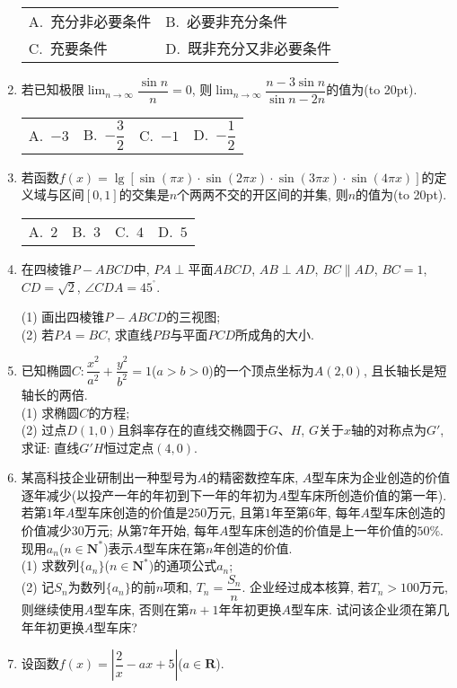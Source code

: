 \documentclass[10pt,a4paper]{article}
\newcommand{\bracket}[1]{(\hbox to #1pt{})}
\newcommand{\twoch}[4]{\par\begin{tabular}{p{.46\textwidth}p{.46\textwidth}}
A.~#1& B.~#2\\
C.~#3& D.~#4
\end{tabular}}
\newcommand{\fourch}[4]{\par\begin{tabular}{p{.23\textwidth}p{.23\textwidth}p{.23\textwidth}p{.23\textwidth}}
A.~#1 &B.~#2& C.~#3& D.~#4
\end{tabular}}
\begin{document}
\begin{enumerate}[1.]
\twoch{充分非必要条件}{必要非充分条件}{充要条件}{既非充分又非必要条件}
\item 若已知极限$\displaystyle\lim_{n\to \infty} \dfrac{\sin n}n=0$, 则$\displaystyle\lim_{n\to \infty} \dfrac{n-3\sin n}{\sin n-2n}$的值为\bracket{20}.
\fourch{$-3$}{$-\dfrac 32$}{$-1$}{$-\dfrac 12$}
\item 若函数$f(x)=\lg [\sin (\pi x)\cdot \sin (2\pi x)\cdot \sin (3\pi x)\cdot \sin (4\pi x)]$的定义域与区间$[0,1]$的交集是$n$个两两不交的开区间的并集, 则$n$的值为\bracket{20}.
\fourch{$2$}{$3$}{$4$}{$5$}
\item 在四棱锥$P-ABCD$中, $PA\perp$平面$ABCD$, $AB\perp AD$, $BC\parallel AD$, $BC=1$, $CD=\sqrt 2$, $\angle CDA=45^{^\circ}$.
\begin{center}
\end{center}
(1) 画出四棱锥$P-ABCD$的三视图;\\
(2) 若$PA=BC$, 求直线$PB$与平面$PCD$所成角的大小.
\item 已知椭圆$C:\dfrac{x^2}{a^2}+\dfrac{y^2}{b^2}=1$($a>b>0$)的一个顶点坐标为$A(2,0)$, 且长轴长是短轴长的两倍.\\
(1) 求椭圆$C$的方程;\\
(2) 过点$D(1,0)$且斜率存在的直线交椭圆于$G$、$H$, $G$关于$x$轴的对称点为$G'$, 求证: 直线$G'H$恒过定点$(4,0)$.
\item 某高科技企业研制出一种型号为$A$的精密数控车床, $A$型车床为企业创造的价值逐年减少(以投产一年的年初到下一年的年初为$A$型车床所创造价值的第一年). 若第$1$年$A$型车床创造的价值是$250$万元, 且第$1$年至第$6$年, 每年$A$型车床创造的价值减少$30$万元; 从第$7$年开始, 每年$A$型车床创造的价值是上一年价值的$50\%$. 现用$a_n$($n\in \mathbf{N}^*$)表示$A$型车床在第$n$年创造的价值.\\
(1) 求数列$\{a_n\}$($n\in \mathbf{N}^*$)的通项公式$a_n$;\\
(2) 记$S_n$为数列$\{a_n\}$的前$n$项和, $T_n=\dfrac{S_n}n$. 企业经过成本核算, 若$T_n>100$万元, 则继续使用$A$型车床, 否则在第$n+1$年年初更换$A$型车床. 试问该企业须在第几年年初更换$A$型车床?
\item 设函数$f(x)=|\dfrac 2x-ax+5|$($a\in \mathbf{R}$).\\

\end{enumerate}
\end{document}
